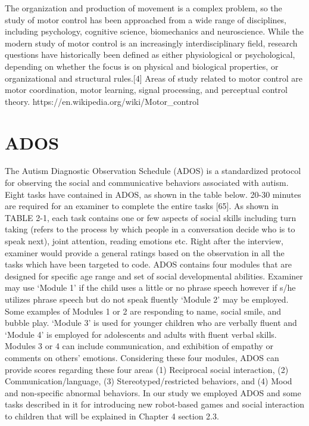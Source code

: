 The organization and production of movement is a complex problem, so the study of 
motor control has been approached from a wide range of disciplines, including 
psychology, cognitive science, biomechanics and neuroscience. While the modern 
study of motor control is an increasingly interdisciplinary field, research 
questions have historically been defined as either physiological or psychological, 
depending on whether the focus is on physical and biological properties, or 
organizational and structural rules.[4] Areas of study related to motor control 
are motor coordination, motor learning, signal processing, and perceptual control 
theory.
https://en.wikipedia.org/wiki/Motor_control


\section{ADOS}
The Autism Diagnostic Observation Schedule (ADOS) is a standardized protocol
for observing the social and communicative behaviors associated with autism. Eight tasks
have contained in ADOS, as shown in the table below. 20-30 minutes are required for an
examiner to complete the entire tasks [65].
As shown in TABLE 2-1, each task contains one or few aspects of social skills
including turn taking (refers to the process by which people in a conversation decide who
is to speak next), joint attention, reading emotions etc. Right after the interview, examiner
would provide a general ratings based on the observation in all the tasks which have been
targeted to code.
ADOS contains four modules that are designed for specific age range and set of social
developmental abilities. Examiner may use ‘Module 1’ if the child uses a little or no phrase
speech however if s/he utilizes phrase speech but do not speak fluently ‘Module 2’ may be
employed. Some examples of Modules 1 or 2 are responding to name, social smile, and
bubble play. ‘Module 3’ is used for younger children who are verbally fluent and ‘Module
4’ is employed for adolescents and adults with fluent verbal skills. Modules 3 or 4 can
include communication, and exhibition of empathy or comments on others' emotions.
Considering these four modules, ADOS can provide scores regarding these four areas (1)
Reciprocal social interaction, (2) Communication/language, (3) Stereotyped/restricted
behaviors, and (4) Mood and non-specific abnormal behaviors. In our study we employed
ADOS and some tasks described in it for introducing new robot-based games and social
interaction to children that will be explained in Chapter 4 section 2.3.



